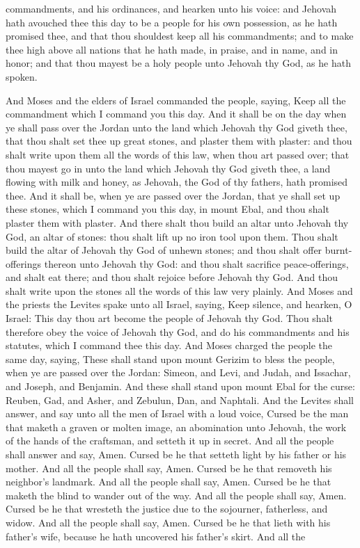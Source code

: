 commandments, and his ordinances, and hearken unto his voice: and Jehovah hath avouched thee this day to be a people for his own possession, as he hath promised thee, and that thou shouldest keep all his commandments; and to make thee high above all nations that he hath made, in praise, and in name, and in honor; and that thou mayest be a holy people unto Jehovah thy God, as he hath spoken. 

And Moses and the elders of Israel commanded the people, saying, Keep all the commandment which I command you this day. And it shall be on the day when ye shall pass over the Jordan unto the land which Jehovah thy God giveth thee, that thou shalt set thee up great stones, and plaster them with plaster: and thou shalt write upon them all the words of this law, when thou art passed over; that thou mayest go in unto the land which Jehovah thy God giveth thee, a land flowing with milk and honey, as Jehovah, the God of thy fathers, hath promised thee. And it shall be, when ye are passed over the Jordan, that ye shall set up these stones, which I command you this day, in mount Ebal, and thou shalt plaster them with plaster. And there shalt thou build an altar unto Jehovah thy God, an altar of stones: thou shalt lift up no iron tool upon them. Thou shalt build the altar of Jehovah thy God of unhewn stones; and thou shalt offer burnt-offerings thereon unto Jehovah thy God: and thou shalt sacrifice peace-offerings, and shalt eat there; and thou shalt rejoice before Jehovah thy God. And thou shalt write upon the stones all the words of this law very plainly.  And Moses and the priests the Levites spake unto all Israel, saying, Keep silence, and hearken, O Israel: This day thou art become the people of Jehovah thy God. Thou shalt therefore obey the voice of Jehovah thy God, and do his commandments and his statutes, which I command thee this day.  And Moses charged the people the same day, saying, These shall stand upon mount Gerizim to bless the people, when ye are passed over the Jordan: Simeon, and Levi, and Judah, and Issachar, and Joseph, and Benjamin. And these shall stand upon mount Ebal for the curse: Reuben, Gad, and Asher, and Zebulun, Dan, and Naphtali. And the Levites shall answer, and say unto all the men of Israel with a loud voice,  Cursed be the man that maketh a graven or molten image, an abomination unto Jehovah, the work of the hands of the craftsman, and setteth it up in secret. And all the people shall answer and say, Amen.  Cursed be he that setteth light by his father or his mother. And all the people shall say, Amen.  Cursed be he that removeth his neighbor’s landmark. And all the people shall say, Amen.  Cursed be he that maketh the blind to wander out of the way. And all the people shall say, Amen.  Cursed be he that wresteth the justice due to the sojourner, fatherless, and widow. And all the people shall say, Amen.  Cursed be he that lieth with his father’s wife, because he hath uncovered his father’s skirt. And all the 